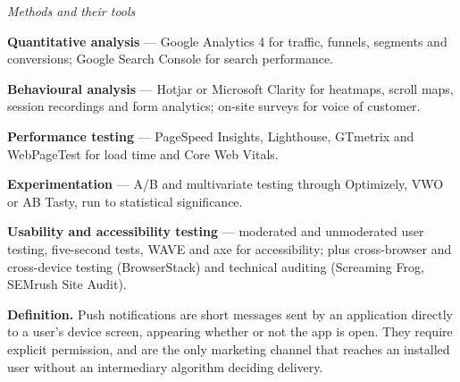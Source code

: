 \begin{qlist}
\textit{Methods and their tools}
\begin{apts}\setcounter{enumi}{5}
\item \textbf{Quantitative analysis} --- Google Analytics 4 for traffic,
      funnels, segments and conversions; Google Search Console for search
      performance.
\item \textbf{Behavioural analysis} --- Hotjar or Microsoft Clarity for
      heatmaps, scroll maps, session recordings and form analytics; on-site
      surveys for voice of customer.
\item \textbf{Performance testing} --- PageSpeed Insights, Lighthouse, GTmetrix
      and WebPageTest for load time and Core Web Vitals.
\item \textbf{Experimentation} --- A/B and multivariate testing through
      Optimizely, VWO or AB Tasty, run to statistical significance.
\item \textbf{Usability and accessibility testing} --- moderated and unmoderated
      user testing, five-second tests, WAVE and axe for accessibility; plus
      cross-browser and cross-device testing (BrowserStack) and technical
      auditing (Screaming Frog, SEMrush Site Audit).
\end{apts}

\textbf{Definition.} Push notifications are short messages sent by an
application directly to a user's device screen, appearing whether or not the app
is open. They require explicit permission, and are the only marketing channel
that reaches an installed user without an intermediary algorithm deciding
delivery.


\end{qlist}
